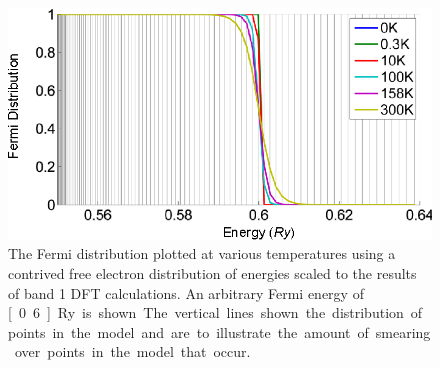 \begin{figure}[htbp]
    \begin{center}
        \includegraphics[scale=0.9]{Chapter3-dHvABaFe2P2/Figures/AngleDepMeasurements/SusceptibilityTempSmearing/SusceptibilityTempSmearing}
        \caption{The Fermi distribution plotted at various temperatures using a contrived free electron distribution of energies scaled to the results of band 1 DFT calculations. An arbitrary Fermi energy of \unit[0.6]{Ry} is shown. The vertical lines shown the distribution of points in the model and are to illustrate the amount of smearing over points in the model that occur.}
        \label{Fig:3:SusceptibilityTempSmearing}
    \end{center}
\end{figure}

